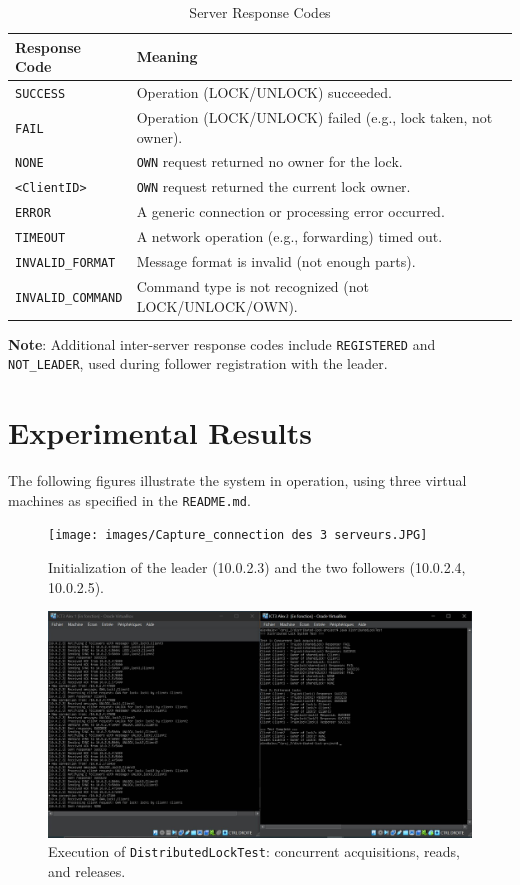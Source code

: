 \documentclass[a4paper,11pt]{article}
\begin{document}
\begin{table}[htbp]
\centering
\caption{Server Response Codes}
\label{tab:responses}
\begin{tabular}{@{}ll@{}}
\toprule
\textbf{Response Code} & \textbf{Meaning} \\
\midrule
\texttt{SUCCESS} & Operation (LOCK/UNLOCK) succeeded. \\
\texttt{FAIL} & Operation (LOCK/UNLOCK) failed (e.g., lock taken, not owner). \\
\texttt{NONE} & \texttt{OWN} request returned no owner for the lock. \\
\texttt{<ClientID>} & \texttt{OWN} request returned the current lock owner. \\
\texttt{ERROR} & A generic connection or processing error occurred. \\
\texttt{TIMEOUT} & A network operation (e.g., forwarding) timed out. \\
\texttt{INVALID\_FORMAT} & Message format is invalid (not enough parts). \\
\texttt{INVALID\_COMMAND} & Command type is not recognized (not LOCK/UNLOCK/OWN). \\
\bottomrule
\end{tabular}
\end{table}

\textbf{Note}: Additional inter-server response codes include \texttt{REGISTERED} and \texttt{NOT\_LEADER}, used during follower registration with the leader.

\section{Experimental Results}
The following figures illustrate the system in operation, using three virtual machines as specified in the \texttt{README.md}.

\begin{figure}[H]
\centering
\texttt{[image: images/Capture\_connection des 3 serveurs.JPG]}
\caption{Initialization of the leader (10.0.2.3) and the two followers (10.0.2.4, 10.0.2.5).}
\end{figure}

\begin{figure}[H]
\centering
\includegraphics[width=0.9\linewidth]{images/Capture_distributed_lock_test.JPG}
\caption{Execution of \texttt{DistributedLockTest}: concurrent acquisitions, reads, and releases.}
\end{figure}
\end{document}
